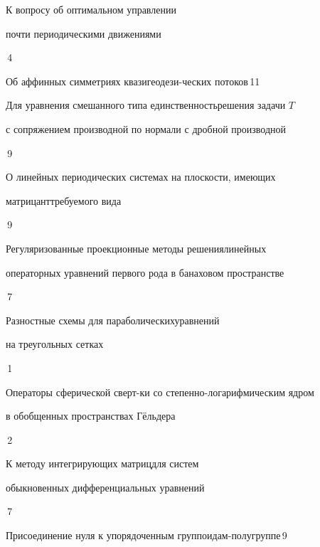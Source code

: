 

{К вопросу об оптимальном управлении 


почти периодическими движениями}{\No\,4}




{Об аффинных симметриях квазигеодези-\newline ческих потоков}{\No\,11}




{Для уравнения смешанного типа единственность\newline решения задачи $T$ 


с сопряжением производной по нормали с дробной производной}{\No\,9}




{О линейных периодических системах на плоскости, имеющих  


матрицант\newline требуемого вида}{\No\,9}




{Регуляризованные проекционные методы решения\newline линейных


операторных уравнений первого рода в банаховом пространстве}{\No\,7}




{Разностные схемы для параболических\newline уравнений


на треугольных сетках}{\No\,1}




{Операторы сферической сверт-\newline ки со степенно-логарифмическим ядром 


в обобщенных пространствах Г\"ельдера}{\No\,2}




{К методу интегрирующих матриц\newline для систем


обыкновенных дифференциальных уравнений}{\No\,7}




{Присоединение нуля к упорядоченным группоидам-\newline полугруппе}{\No\,9}


